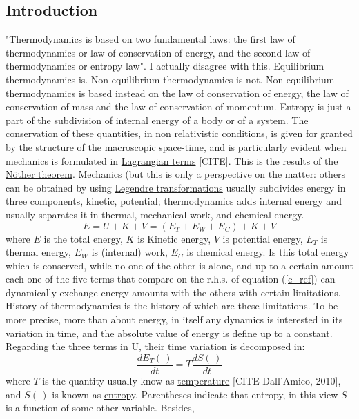 \subsection{Introduction}

"Thermodynamics is based on two fundamental laws: the first law of thermodynamics or law of conservation of energy, and the second law of thermodynamics or entropy law".  I actually disagree with this. Equilibrium thermodynamics is. Non-equilibrium thermodynamics is not. Non equilibrium thermodynamics is based instead on the law of conservation of energy, the law of conservation of mass and the law of conservation of momentum. Entropy is just a part of the subdivision of internal energy of a body or of a system. The conservation of these quantities, in non relativistic conditions, is given for granted by the structure of the macroscopic space-time, and is particularly evident when mechanics is formulated in \href{https://en.wikipedia.org/wiki/Lagrangian_mechanics}{Lagrangian terms} [CITE]. This is the results of the \href{https://en.wikipedia.org/wiki/Noether%27s_theorem}{Nöther theorem}. 
Mechanics (but this is only a perspective on the matter: others can be obtained by using \href{https://en.wikipedia.org/wiki/Legendre_transformation}{Legendre transformations} usually subdivides energy in three components, kinetic, potential; thermodynamics adds internal  energy and usually separates it in thermal, mechanical work, and chemical energy.
\begin{equation}
E = U  + K + V = (E_T + E_W + E_C) + K + V
\label{e_cons}
\end{equation}
where $E$ is the total energy, $K$ is Kinetic energy, $V$ is potential energy, $E_T$ is thermal energy, $E_W$ is (internal) work, $E_C$ is chemical energy. Is this total energy which is conserved, while no one of the other is alone, and up to a certain amount each one of the five terms that compare on the r.h.s. of equation (\ref{e_ref}) can dynamically exchange energy amounts with the others with certain limitations. 
History of thermodynamics is the history of which are these limitations. To be more precise, more than about energy, in itself any dynamics is interested in its variation in time, and the absolute value of energy is define up to a constant. 
Regarding the three terms in U, their time variation is decomposed in:
\begin{equation}
\frac{dE_T(\,)}{dt} = T \frac{dS(\,)}{dt}
\label{ET}
\end{equation}
where $T$ is the quantity usually know as \href{https://en.wikipedia.org/wiki/Temperature}{temperature} [CITE Dall'Amico, 2010], and $S(\,)$ is known as \href{https://en.wikipedia.org/wiki/Entropy}{entropy}. Parentheses indicate that entropy, in this view $S$ is a function of some other variable. Besides, 
